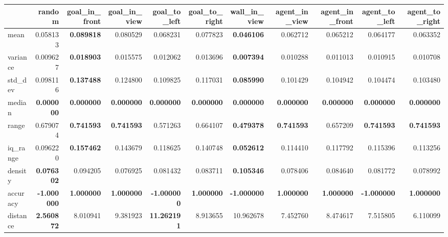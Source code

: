 \begin{tabular}{lrrrrrrrrrr}
\toprule
 & random & goal\_in\_front & goal\_in\_view & goal\_to\_left & goal\_to\_right & wall\_in\_view & agent\_in\_view & agent\_in\_front & agent\_to\_left & agent\_to\_right \\
\midrule
mean & 0.058133 & \color{f_green} \bfseries 0.089818 & 0.080529 & 0.068231 & 0.077823 & \color{f_darkred} \bfseries 0.046106 & 0.062712 & 0.065212 & 0.064177 & 0.063352 \\
variance & 0.009627 & \color{f_green} \bfseries 0.018903 & 0.015575 & 0.012062 & 0.013696 & \color{f_darkred} \bfseries 0.007394 & 0.010288 & 0.011013 & 0.010915 & 0.010708 \\
std\_dev & 0.098116 & \color{f_green} \bfseries 0.137488 & 0.124800 & 0.109825 & 0.117031 & \color{f_darkred} \bfseries 0.085990 & 0.101429 & 0.104942 & 0.104474 & 0.103480 \\
median & \color{f_green} \bfseries \color{f_darkred} \bfseries 0.000000 & \color{f_green} \bfseries \color{f_darkred} \bfseries 0.000000 & \color{f_green} \bfseries \color{f_darkred} \bfseries 0.000000 & \color{f_green} \bfseries \color{f_darkred} \bfseries 0.000000 & \color{f_green} \bfseries \color{f_darkred} \bfseries 0.000000 & \color{f_green} \bfseries \color{f_darkred} \bfseries 0.000000 & \color{f_green} \bfseries \color{f_darkred} \bfseries 0.000000 & \color{f_green} \bfseries \color{f_darkred} \bfseries 0.000000 & \color{f_green} \bfseries \color{f_darkred} \bfseries 0.000000 & \color{f_green} \bfseries \color{f_darkred} \bfseries 0.000000 \\
range & 0.679074 & \color{f_green} \bfseries 0.741593 & \color{f_green} \bfseries 0.741593 & 0.571263 & 0.664107 & \color{f_darkred} \bfseries 0.479378 & \color{f_green} \bfseries 0.741593 & 0.657209 & \color{f_green} \bfseries 0.741593 & \color{f_green} \bfseries 0.741593 \\
iq\_range & 0.096220 & \color{f_green} \bfseries 0.157462 & 0.143679 & 0.118625 & 0.140748 & \color{f_darkred} \bfseries 0.052612 & 0.114410 & 0.117792 & 0.115396 & 0.113256 \\
density & \color{f_darkred} \bfseries 0.076302 & 0.094205 & 0.076925 & 0.081432 & 0.083711 & \color{f_green} \bfseries 0.105346 & 0.078406 & 0.084640 & 0.081772 & 0.078992 \\
accuracy & \color{f_darkred} \bfseries -1.000000 & \color{f_green} \bfseries 1.000000 & \color{f_green} \bfseries 1.000000 & \color{f_darkred} \bfseries -1.000000 & \color{f_green} \bfseries 1.000000 & \color{f_darkred} \bfseries -1.000000 & \color{f_green} \bfseries 1.000000 & \color{f_green} \bfseries 1.000000 & \color{f_darkred} \bfseries -1.000000 & \color{f_green} \bfseries 1.000000 \\
distance & \color{f_darkred} \bfseries 2.560872 & 8.010941 & 9.381923 & \color{f_green} \bfseries 11.262191 & 8.913655 & 10.962678 & 7.452760 & 8.474617 & 7.515805 & 6.110099 \\
\bottomrule
\end{tabular}